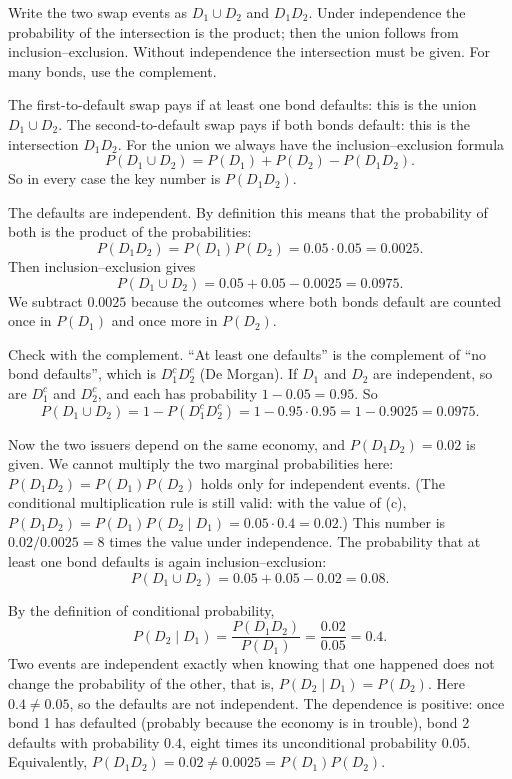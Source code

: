 \begin{solution}
	\idea Write the two swap events as $D_1\cup D_2$ and $D_1D_2$. Under
	independence the probability of the intersection is the product; then the
	union follows from inclusion--exclusion. Without independence the
	intersection must be given. For many bonds, use the complement.

	 The first-to-default swap pays if at least one bond
	defaults: this is the union $D_1\cup D_2$. The second-to-default swap pays
	if both bonds default: this is the intersection $D_1D_2$. For the union we
	always have the inclusion--exclusion formula
	\[ P(D_1\cup D_2)=P(D_1)+P(D_2)-P(D_1D_2). \]
	So in every case the key number is $P(D_1D_2)$.

	 The defaults are independent. By definition this means that the
	probability of both is the product of the probabilities:
	\[ P(D_1D_2)=P(D_1)P(D_2)=0.05\cdot0.05=0.0025. \]
	Then inclusion--exclusion gives
	\[ P(D_1\cup D_2)=0.05+0.05-0.0025=0.0975. \]
	We subtract $0.0025$ because the outcomes where both bonds default are
	counted once in $P(D_1)$ and once more in $P(D_2)$.

	Check with the complement. ``At least one defaults'' is the complement of
	``no bond defaults'', which is $D_1^cD_2^c$ (De Morgan). If $D_1$ and $D_2$
	are independent, so are $D_1^c$ and $D_2^c$, and each has probability
	$1-0.05=0.95$. So
	\[ P(D_1\cup D_2)=1-P(D_1^cD_2^c)=1-0.95\cdot0.95=1-0.9025=0.0975. \]

	 Now the two issuers depend on the same economy, and
	$P(D_1D_2)=0.02$ is given. We cannot multiply the two marginal
	probabilities here: $P(D_1D_2)=P(D_1)P(D_2)$ holds only for independent
	events. (The conditional multiplication rule is still valid: with the
	value of (c), $P(D_1D_2)=P(D_1)P(D_2\mid D_1)=0.05\cdot0.4=0.02$.) This number is $0.02/0.0025=8$ times
	the value under independence. The probability that at least one bond
	defaults is again inclusion--exclusion:
	\[ P(D_1\cup D_2)=0.05+0.05-0.02=0.08. \]

	 By the definition of conditional probability,
	\[ P(D_2\mid D_1)=\frac{P(D_1D_2)}{P(D_1)}=\frac{0.02}{0.05}=0.4. \]
	Two events are independent exactly when knowing that one happened does not
	change the probability of the other, that is, $P(D_2\mid D_1)=P(D_2)$.
	Here $0.4\ne0.05$, so the defaults are not independent. The dependence is
	positive: once bond 1 has defaulted (probably because the economy is in
	trouble), bond 2 defaults with probability $0.4$, eight times its
	unconditional probability $0.05$. Equivalently,
	$P(D_1D_2)=0.02\ne0.0025=P(D_1)P(D_2)$.


\end{solution}
